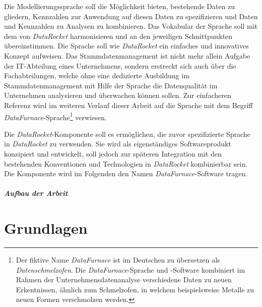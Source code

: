 \documentclass[
  language=german, %
  type=bachelor%
]{isthesis}
\begin{document}
\begin{content}
  Die Modellierungssprache soll die Möglichkeit bieten, bestehende Daten zu
  gliedern, Kennzahlen zur Anwendung auf diesen Daten zu spezifizieren und
  Daten und Kennzahlen zu Analysen zu kombinieren. Das Vokabular der Sprache
  soll mit dem von \textit{DataRocket} harmonisieren und an den jeweiligen
  Schnittpunkten übereinstimmen.  Die Sprache soll wie \textit{DataRocket} ein
  einfaches und innovatives Konzept aufweisen. Das Stammdatenmanagement ist
  nicht mehr allein Aufgabe der IT-Abteilung eines Unternehmens,
  sondern erstreckt sich auch über die Fachabteilungen, welche ohne eine
  dedizierte Ausbildung im Stammdatenmanagement mit Hilfe der Sprache die
  Datenqualität im Unternehmen analysieren und überwachen können sollen. Zur
  einfacheren Referenz wird im weiteren Verlauf dieser Arbeit auf die Sprache
  mit dem Begriff \textit{DataFurnace}-Sprache\footnote{Der fiktive Name
  \textit{DataFurnace} ist im Deutschen zu übersetzen als
  \textit{Datenschmelzofen}. Die \textit{DataFurnace}-Sprache und -Software
  kombiniert im Rahmen der Unternehmensdatenanalyse verschiedene Daten zu neuen
  Erkentnissen, ähnlich zum Schmelzofen, in welchem beispielsweise Metalle zu
  neuen Formen verschmolzen werden.} verwiesen.

  Die \textit{DataRocket}-Komponente soll es ermöglichen, die zuvor
  spezifizierte Sprache in \textit{DataRocket} zu verwenden. Sie wird als
  eigenständiges Softwareprodukt konzipiert und entwickelt, soll jedoch zur
  späteren Integration mit den bestehenden Konventionen und Technologien in
  \textit{DataRocket} kombinierbar sein. Die Komponente wird im Folgenden den
  Namen \textit{DataFurnace}-Software  tragen.

  \paragraph{Aufbau der Arbeit}




  \chapter{Grundlagen}
  


\end{content}
\end{document}
